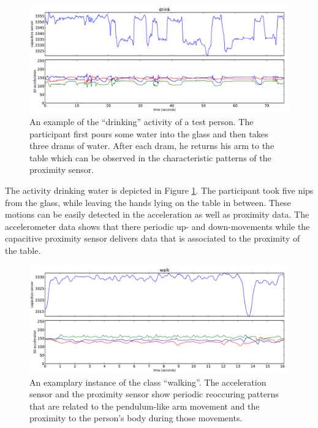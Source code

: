 \documentclass[runningheads,a4paper]{llncs}
\begin{document}
\begin{figure}[htpb]
	\centering
		\includegraphics[width=\textwidth]{../Auswertung/images/eugen_7.pdf}
	\caption{An example of the ``drinking'' activity of a test person. The participant first pours some water into the glass and then takes three drams of water. After each dram, he returns his arm to the table which can be observed in the characteristic patterns of the proximity sensor.}
	\label{fig:eugen_7}
\end{figure}

The activity drinking water is depicted in Figure \ref{fig:eugen_7}. The participant took five nips from the glass, while leaving the hands lying on the table in between. These motions can be easily detected in the acceleration as well as proximity data. The accelerometer data shows that there periodic up- and down-movements while the capacitive proximity sensor delivers data that is associated to the proximity of the table.

\begin{figure}[htbp]
	\centering
		\includegraphics[width=1.00\textwidth]{../Auswertung/images/marko_8.pdf}
	\caption{An examplary instance of the class ``walking''. The acceleration sensor and the proximity sensor show periodic reoccuring patterns that are related to the pendulum-like arm movement and the proximity to the person's body during those movements.}
	\label{fig:marko_8}
\end{figure}
\end{document}
